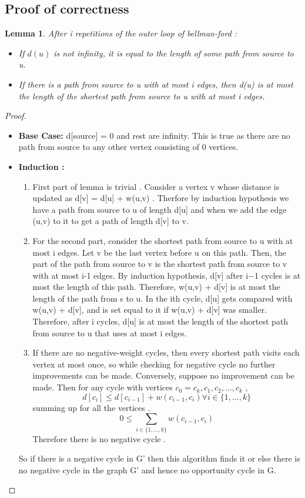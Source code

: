 \documentclass[11pt]{article}
\newtheorem{lemma}[theorem]{Lemma}
\begin{document}
\subsection*{Proof of correctness}
\begin{lemma}
After i repetitions of the outer loop of bellman-ford :
\begin{itemize}
\item If $d(u)$ is not infinity, it is equal to the length of some path from source to u.
\item If there is a path from source to u with at most i edges, then d(u) is at most the length of the shortest path from source to u with at most i edges.
\end{itemize}
\end{lemma}
\begin{proof}
\begin{itemize}
\item \textbf{Base Case: } d[source] = 0 and rest are infinity. This is true as there are no path from source to any other vertex consisting of 0 vertices. 
\item \textbf{Induction : } 
\begin{enumerate} 
\item First part of lemma is trivial . Consider a vertex v whose distance is updated as d[v] = d[u] + w(u,v) . Therfore by induction hypothesis we have a path from source to u of length d[u] and when we add the edge (u,v) to it to get a path of length d[v] to v. 
\item For the second part, consider the shortest path from source to u with at most i edges. Let v be the last vertex before u on this path. Then, the part of the path from source to v is the shortest path from source to v with at most i-1 edges. By induction hypothesis, d[v] after i−1 cycles is at most the length of this path. Therefore, w(u,v) + d[v] is at most the length of the path from s to u. In the ith cycle, d[u] gets compared with w(u,v) + d[v], and is set equal to it if w(u,v) + d[v] was smaller. Therefore, after i cycles, d[u] is at most the length of the shortest path from source to u that uses at most i edges. 
\item If there are no negative-weight cycles, then every shortest path visits each vertex at most once, so while checking for negative cycle no further improvements can be made. Conversely, suppose no improvement can be made. Then for any cycle with vertices $c_0 = c_k , c_1 , c_2 , \ldots , c_k$ ,
\[
d[c_{i}] \leq d[c_{i-1}] +  w(c_{i-1},c_{i}) \forall i \in \lbrace 1,\ldots ,k\rbrace \]
summing up for all the vertices . 
\[ 
0 \leq \sum_{i \in \lbrace 1,\ldots ,k\rbrace } {w(c_{i-1},c_{i})}
\]
Therefore there is no negative cycle .
\end{enumerate}
So if there is a negative cycle in G' then this algorithm finds it or else there is no negative cycle in the graph G' and hence no opportunity cycle in G. 
\end{itemize}
\end{proof}
\end{document}
